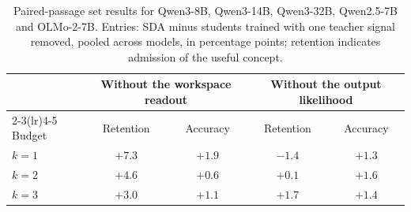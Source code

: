 \begin{table}[t]
\centering
\caption{Paired-passage set results for Qwen3-8B, Qwen3-14B, Qwen3-32B, Qwen2.5-7B and OLMo-2-7B.
Entries: SDA minus students trained with one teacher signal removed, pooled across models, in
percentage points; retention indicates admission of the useful concept.}
\label{tab:crosspairpooled}
\small
\setlength{\tabcolsep}{4pt}
\begin{tabular}{lcccc}
\toprule
& \multicolumn{2}{c}{Without the workspace readout} & \multicolumn{2}{c}{Without the output likelihood} \\
\cmidrule(lr){2-3}\cmidrule(lr){4-5}
Budget & Retention & Accuracy & Retention & Accuracy \\
\midrule
$k=1$ & $+7.3$ & $+1.9$ & $-1.4$ & $+1.3$ \\
$k=2$ & $+4.6$ & $+0.6$ & $+0.1$ & $+1.6$ \\
$k=3$ & $+3.0$ & $+1.1$ & $+1.7$ & $+1.4$ \\
\bottomrule
\end{tabular}
\end{table}
